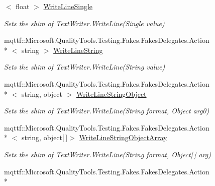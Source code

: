 \begin{DoxyCompactItemize}
$<$ float $>$ \hyperlink{class_system_1_1_i_o_1_1_fakes_1_1_shim_text_writer_a2e6dd9ed743c1f0814b12e8bf114e2fe}{Write\-Line\-Single}
\begin{DoxyCompactList}\small\item\em Sets the shim of Text\-Writer.\-Write\-Line(\-Single value)\end{DoxyCompactList}\item 
mqttf\-::\-Microsoft.\-Quality\-Tools.\-Testing.\-Fakes.\-Fakes\-Delegates.\-Action\\*
$<$ string $>$ \hyperlink{class_system_1_1_i_o_1_1_fakes_1_1_shim_text_writer_a6d293f12bc3a6cd348db16c706046aff}{Write\-Line\-String}
\begin{DoxyCompactList}\small\item\em Sets the shim of Text\-Writer.\-Write\-Line(\-String value)\end{DoxyCompactList}\item 
mqttf\-::\-Microsoft.\-Quality\-Tools.\-Testing.\-Fakes.\-Fakes\-Delegates.\-Action\\*
$<$ string, object $>$ \hyperlink{class_system_1_1_i_o_1_1_fakes_1_1_shim_text_writer_aa08e4c36295eb5f2047f0f8e4c399a9c}{Write\-Line\-String\-Object}
\begin{DoxyCompactList}\small\item\em Sets the shim of Text\-Writer.\-Write\-Line(\-String format, Object arg0)\end{DoxyCompactList}\item 
mqttf\-::\-Microsoft.\-Quality\-Tools.\-Testing.\-Fakes.\-Fakes\-Delegates.\-Action\\*
$<$ string, object\mbox{[}$\,$\mbox{]}$>$ \hyperlink{class_system_1_1_i_o_1_1_fakes_1_1_shim_text_writer_a5f06e2dba329e4cbc3cd29fa46e3e5e4}{Write\-Line\-String\-Object\-Array}
\begin{DoxyCompactList}\small\item\em Sets the shim of Text\-Writer.\-Write\-Line(\-String format, Object\mbox{[}$\,$\mbox{]} arg)\end{DoxyCompactList}\item 
mqttf\-::\-Microsoft.\-Quality\-Tools.\-Testing.\-Fakes.\-Fakes\-Delegates.\-Action\\*

\end{DoxyCompactItemize}
